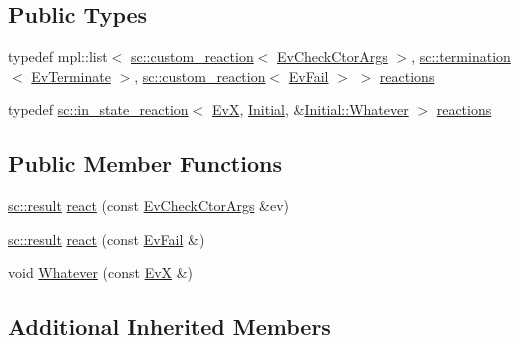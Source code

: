 \subsection*{Public Types}
\begin{DoxyCompactItemize}
\item 
typedef mpl\+::list$<$ \mbox{\hyperlink{classboost_1_1statechart_1_1custom__reaction}{sc\+::custom\+\_\+reaction}}$<$ \mbox{\hyperlink{struct_ev_check_ctor_args}{Ev\+Check\+Ctor\+Args}} $>$, \mbox{\hyperlink{classboost_1_1statechart_1_1termination}{sc\+::termination}}$<$ \mbox{\hyperlink{struct_ev_terminate}{Ev\+Terminate}} $>$, \mbox{\hyperlink{classboost_1_1statechart_1_1custom__reaction}{sc\+::custom\+\_\+reaction}}$<$ \mbox{\hyperlink{struct_ev_fail}{Ev\+Fail}} $>$ $>$ \mbox{\hyperlink{struct_initial_a4f92c6c4abdfc993dc9b0f20bab71522}{reactions}}
\item 
typedef \mbox{\hyperlink{classboost_1_1statechart_1_1in__state__reaction}{sc\+::in\+\_\+state\+\_\+reaction}}$<$ \mbox{\hyperlink{struct_ev_x}{EvX}}, \mbox{\hyperlink{struct_initial}{Initial}}, \&\mbox{\hyperlink{struct_initial_a90852b531c8b25d4f321fc5b37fa86a9}{Initial\+::\+Whatever}} $>$ \mbox{\hyperlink{struct_initial_ae59c180b2502baea61d37fde8fbc2f3f}{reactions}}
\end{DoxyCompactItemize}
\subsection*{Public Member Functions}
\begin{DoxyCompactItemize}
\item 
\mbox{\hyperlink{namespaceboost_1_1statechart_abe807f6598b614d6d87bb951ecd92331}{sc\+::result}} \mbox{\hyperlink{struct_initial_a9a8f94a14d12fff4485db1360ee999ff}{react}} (const \mbox{\hyperlink{struct_ev_check_ctor_args}{Ev\+Check\+Ctor\+Args}} \&ev)
\item 
\mbox{\hyperlink{namespaceboost_1_1statechart_abe807f6598b614d6d87bb951ecd92331}{sc\+::result}} \mbox{\hyperlink{struct_initial_ace728b7a36e35687684f77659462e87b}{react}} (const \mbox{\hyperlink{struct_ev_fail}{Ev\+Fail}} \&)
\item 
void \mbox{\hyperlink{struct_initial_a90852b531c8b25d4f321fc5b37fa86a9}{Whatever}} (const \mbox{\hyperlink{struct_ev_x}{EvX}} \&)
\end{DoxyCompactItemize}
\subsection*{Additional Inherited Members}


